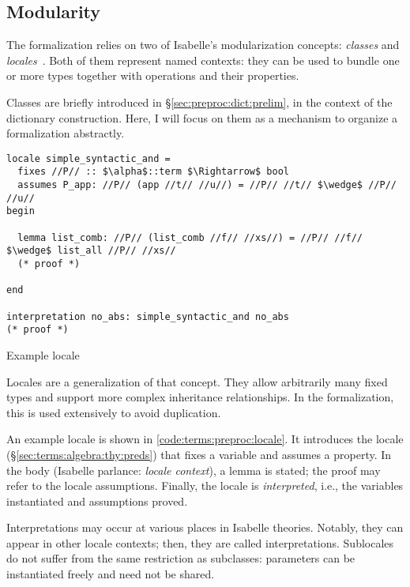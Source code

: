 \subsection{Modularity}
\label{sec:terms:prelim:modularity}

The formalization relies on two of Isabelle's modularization concepts: \emph{classes} and \emph{locales}~\cite{ballarin2018locales}.
Both of them represent named contexts:
they can be used to bundle one or more types together with operations and their properties.

Classes are briefly introduced in §\ref{sec:preproc:dict:prelim}, in the context of the dictionary construction.
Here, I will focus on them as a mechanism to organize a formalization abstractly.

\begin{code}[t]
  \begin{lstlisting}
locale simple_syntactic_and =
  fixes //P// :: $\alpha$::term $\Rightarrow$ bool
  assumes P_app: //P// (app //t// //u//) = //P// //t// $\wedge$ //P// //u//
begin

  lemma list_comb: //P// (list_comb //f// //xs//) = //P// //f// $\wedge$ list_all //P// //xs//
  (* proof *)

end

interpretation no_abs: simple_syntactic_and no_abs
(* proof *)
  \end{lstlisting}
  \caption{Example locale}
  \label{code:terms:preproc:locale}
\end{code}

Locales are a generalization of that concept.
They allow arbitrarily many fixed types and support more complex inheritance relationships.
In the formalization, this is used extensively to avoid duplication.

An example locale is shown in \cref{code:terms:preproc:locale}.
It introduces the locale  (§\ref{sec:terms:algebra:thy:preds}) that fixes a variable and assumes a property.
In the body (Isabelle parlance: \emph{locale context}), a lemma is stated; the proof may refer to the locale assumptions.
Finally, the locale is \emph{interpreted}, i.e., the variables instantiated and assumptions proved.

Interpretations may occur at various places in Isabelle theories.
Notably, they can appear in other locale contexts; then, they are called  interpretations.
Sublocales do not suffer from the same restriction as subclasses: parameters can be instantiated freely and need not be shared.

